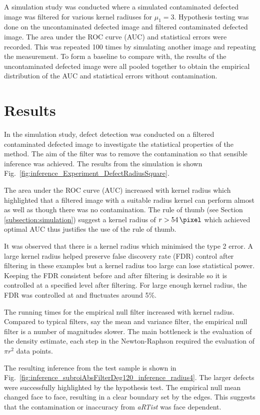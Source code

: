 \documentclass{article}
\begin{document}
A simulation study was conducted where a simulated contaminated defected image was filtered for various kernel radiuses for $\mu_1=3$. Hypothesis testing was done on the uncontaminated defected image and filtered contaminated defected image. The area under the ROC curve (AUC) and statistical errors were recorded. This was repeated 100 times by simulating another image and repeating the measurement. To form a baseline to compare with, the results of the uncontaminated defected image were all pooled together to obtain the empirical distribution of the AUC and statistical errors without contamination.

\section{Results}

In the simulation study, defect detection was conducted on a filtered contaminated defected image to investigate the statistical properties of the method. The aim of the filter was to remove the contamination so that sensible inference was achieved. The results from the simulation is shown Fig.~\ref{fig:inference_Experiment_DefectRadiusSquare}.

The area under the ROC curve (AUC) increased with kernel radius which highlighted that a filtered image with a suitable radius kernel can perform almost as well as though there was no contamination. The rule of thumb (see Section \ref{subsection:simulation}) suggest a kernel radius of $r>\SI{54}{\pixel}$ which achieved optimal AUC thus justifies the use of the rule of thumb.

It was observed that there is a kernel radius which minimised the type 2 error. A large kernel radius helped preserve false discovery rate (FDR) control after filtering in these examples but a kernel radius too large can lose statistical power. Keeping the FDR consistent before and after filtering is desirable so it is controlled at a specified level after filtering. For large enough kernel radius, the FDR was controlled at and fluctuates around 5\%.

The running times for the empirical null filter increased with kernel radius. Compared to typical filters, say the mean and variance filter, the empirical null filter is a number of magnitudes slower. The main bottleneck is the evaluation of the density estimate, each step in the Newton-Raphson required the evaluation of $\pi r^2$ data points.

The resulting inference from the test sample is shown in Fig.~\ref{fig:inference_subroiAbsFilterDeg120_inference_radius4}. The larger defects were successfully highlighted by the hypothesis test. The empirical null mean changed face to face, resulting in a clear boundary set by the edges. This suggests that the contamination or inaccuracy from \emph{aRTist} was face dependent.
\end{document}
